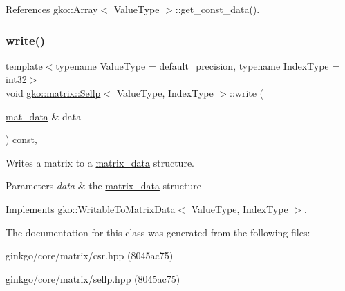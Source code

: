 References gko\+::\+Array$<$ Value\+Type $>$\+::get\+\_\+const\+\_\+data().

\mbox{\label{classgko_1_1matrix_1_1Sellp_aae2355a2866318b154d017b1c51f30a5}} 
\subsubsection{\texorpdfstring{write()}{write()}}
{\footnotesize\ttfamily template$<$typename Value\+Type = default\+\_\+precision, typename Index\+Type = int32$>$ \\
void \hyperlink{classgko_1_1matrix_1_1Sellp}{gko\+::matrix\+::\+Sellp}$<$ Value\+Type, Index\+Type $>$\+::write (\begin{DoxyParamCaption}\item[{\hyperlink{structgko_1_1matrix__data}{mat\+\_\+data} \&}]{data }\end{DoxyParamCaption}) const\hspace{0.3cm}{\ttfamily [override]}, {\ttfamily [virtual]}}



Writes a matrix to a \hyperlink{structgko_1_1matrix__data}{matrix\+\_\+data} structure. 


\begin{DoxyParams}{Parameters}
{\em data} & the \hyperlink{structgko_1_1matrix__data}{matrix\+\_\+data} structure \\
\hline
\end{DoxyParams}


Implements \hyperlink{classgko_1_1WritableToMatrixData_a96036c3a4bf4c67fa93002808b8b14e2}{gko\+::\+Writable\+To\+Matrix\+Data$<$ Value\+Type, Index\+Type $>$}.



The documentation for this class was generated from the following files\+:\begin{DoxyCompactItemize}
\item 
ginkgo/core/matrix/csr.\+hpp (8045ac75)\item 
ginkgo/core/matrix/sellp.\+hpp (8045ac75)\end{DoxyCompactItemize}

